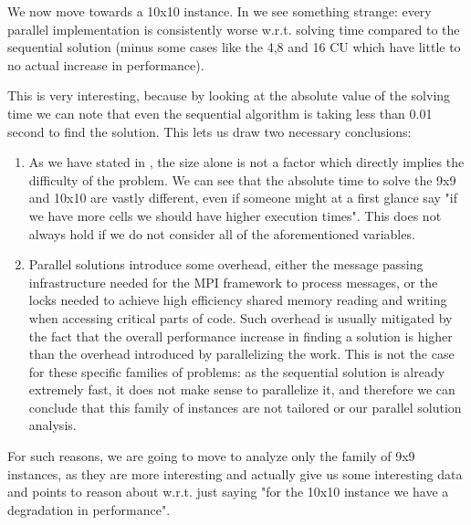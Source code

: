 We now move towards a 10x10 instance. In  we see something strange: every parallel implementation is consistently worse w.r.t. solving time compared to the sequential solution (minus some cases like the 4,8 and 16 CU which have little to no actual increase in performance). 

This is very interesting, because by looking at the absolute value of the solving time we can note that even the sequential algorithm is taking less than 0.01 second to find the solution. This lets us draw two necessary conclusions:
\begin{enumerate}
    \item As we have stated in , the size alone is not a factor which directly implies the difficulty of the problem. We can see that the absolute time to solve the 9x9 and 10x10 are vastly different, even if someone might at a first glance say "if we have more cells we should have higher execution times". This does not always hold if we do not consider all of the aforementioned variables.
    \item Parallel solutions introduce some overhead, either the message passing infrastructure needed for the MPI framework to process messages, or the locks needed to achieve high efficiency shared memory reading and writing when accessing critical parts of code. Such overhead is usually mitigated by the fact that the overall performance increase in finding a solution is higher than the overhead introduced by parallelizing the work. This is not the case for these specific families of problems: as the sequential solution is already extremely fast, it does not make sense to parallelize it, and therefore we can conclude that this family of instances are not tailored or our parallel solution analysis.
\end{enumerate}

For such reasons, we are going to move to analyze only the family of 9x9 instances, as they are more interesting and actually give us some interesting data and points to reason about w.r.t. just saying "for the 10x10 instance we have a degradation in performance".

